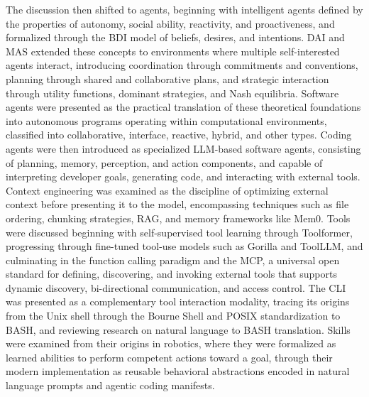 \documentclass[
english,                 %
bibtex,                  %
includeExtraAbstracts, %
]{kththesis}
\numberwithin{listing}{chapter}
\begin{document}
The discussion then shifted to agents, beginning with intelligent agents defined by the properties of autonomy, social ability, reactivity, and proactiveness, and formalized through the \gls{BDI} model of beliefs, desires, and intentions. \Gls{DAI} and \gls{MAS} extended these concepts to environments where multiple self-interested agents interact, introducing coordination through commitments and conventions, planning through shared and collaborative plans, and strategic interaction through utility functions, dominant strategies, and Nash equilibria. Software agents were presented as the practical translation of these theoretical foundations into autonomous programs operating within computational environments, classified into collaborative, interface, reactive, hybrid, and other types. Coding agents were then introduced as specialized \gls{LLM}-based software agents, consisting of planning, memory, perception, and action components, and capable of interpreting developer goals, generating code, and interacting with external tools. Context engineering was examined as the discipline of optimizing external context before presenting it to the model, encompassing techniques such as file ordering, chunking strategies, \gls{RAG}, and memory frameworks like Mem0. Tools were discussed beginning with self-supervised tool learning through Toolformer, progressing through fine-tuned tool-use models such as Gorilla and Tool\gls{LLM}, and culminating in the function calling paradigm and the \gls{MCP}, a universal open standard for defining, discovering, and invoking external tools that supports dynamic discovery, bi-directional communication, and access control. The \gls{CLI} was presented as a complementary tool interaction modality, tracing its origins from the Unix shell through the Bourne Shell and \gls{POSIX} standardization to \gls{BASH}, and reviewing research on natural language to \gls{BASH} translation. Skills were examined from their origins in robotics, where they were formalized as learned abilities to perform competent actions toward a goal, through their modern implementation as reusable behavioral abstractions encoded in natural language prompts and agentic coding manifests.
\end{document}
